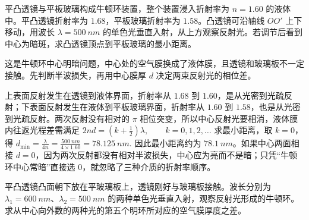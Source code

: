 \documentclass[lang=cn,11pt]{elegantbook}
\begin{document}
\begin{exercise}
平凸透镜与平板玻璃构成牛顿环装置，整个装置浸入折射率为 \(n=\num{1.60}\) 的液体中。平凸透镜折射率为 \(\num{1.68}\)，平板玻璃折射率为 \(\num{1.58}\)。凸透镜可沿轴线 \(OO'\) 上下移动，用波长 \(\lambda=\SI{500}{nm}\) 的单色光垂直入射，从上方观察反射光。若调节后看到中心为暗斑，求凸透镜顶点到平板玻璃的最小距离。

\begin{center}
\end{center}
\end{exercise}

\begin{solution}
这是牛顿环中心明暗问题，中心处的空气膜换成了液体膜，且透镜和玻璃板不一定接触。先判断半波损失，再用中心膜厚 \(d\) 决定两束反射光的相位差。

上表面反射发生在透镜到液体界面，折射率从 \(\num{1.68}\) 到 \(\num{1.60}\)，是从光密到光疏反射；下表面反射发生在液体到平板玻璃界面，折射率从 \(\num{1.60}\) 到 \(\num{1.58}\)，也是从光密到光疏反射。两次反射没有相对的 \(\pi\) 相位突变，所以中心反射光要相消，液体膜内往返光程差需满足
 \(2nd=\left(k+\frac12\right)\lambda,\qquad k=0,1,2,\dots\) 
求最小距离，取 \(k=0\)，得
 \(d_{\min}=\frac{\lambda}{4n} =\frac{\SI{500}{nm}}{4\times1.60} =\SI{78.125}{nm}.\) 
因此最小距离约为 \(\SI{78.1}{nm}\)。如果中心两面相接 \(d=0\)，因为两次反射都没有相对半波损失，中心应为亮而不是暗；只凭“牛顿环中心常暗”直接选 \(0\)，就忽略了三种介质的折射率顺序。
\end{solution}


\begin{exercise}[两种波长第五个牛顿环明环对应膜厚差]
平凸透镜凸面朝下放在平玻璃板上，透镜刚好与玻璃板接触。波长分别为 \(\lambda_1=\SI{600}{nm}\)、\(\lambda_2=\SI{500}{nm}\) 的两种单色光垂直入射，观察反射光形成的牛顿环。求从中心向外数的两种光的第五个明环所对应的空气膜厚度之差。
\end{exercise}
\end{document}
